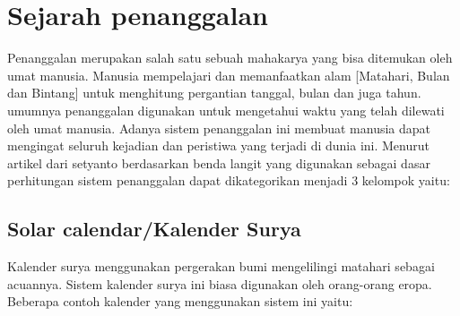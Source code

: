 

\section{Sejarah penanggalan}
  Penanggalan merupakan salah satu sebuah mahakarya yang bisa ditemukan oleh umat manusia. Manusia mempelajari dan memanfaatkan alam [Matahari, Bulan dan Bintang] untuk menghitung pergantian tanggal, bulan dan juga tahun.
umumnya penanggalan digunakan untuk mengetahui waktu yang telah dilewati oleh umat manusia. Adanya sistem penanggalan ini membuat manusia dapat mengingat seluruh kejadian dan peristiwa yang terjadi di dunia ini.
Menurut artikel dari setyanto berdasarkan benda langit yang digunakan sebagai dasar perhitungan sistem penanggalan dapat dikategorikan menjadi 3 kelompok yaitu:\cite{setyanto2015kriteria}

  \subsection{Solar calendar/Kalender Surya}
    Kalender surya menggunakan pergerakan bumi mengelilingi matahari sebagai acuannya. Sistem kalender surya ini biasa digunakan oleh orang-orang eropa. Beberapa contoh kalender yang menggunakan sistem ini yaitu:

